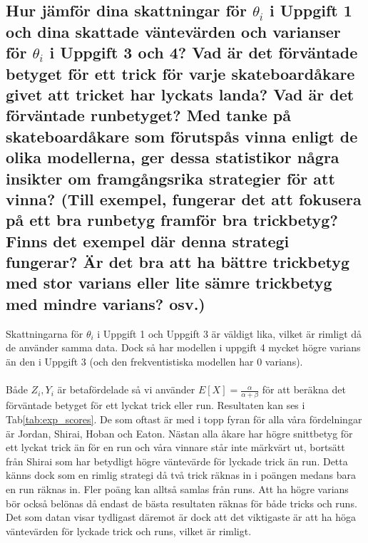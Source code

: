 \documentclass{article}
\begin{document}
\subsection{Hur jämför dina skattningar för $\theta_i$ i Uppgift 1 och dina skattade väntevärden och varianser för $\theta_i$ i Uppgift 3 och 4? Vad är det förväntade betyget för ett trick för varje skateboardåkare givet att tricket har lyckats landa? Vad är det förväntade runbetyget? Med tanke på skateboardåkare som förutspås vinna enligt de olika modellerna, ger dessa statistikor några insikter om framgångsrika strategier för att vinna? (Till exempel, fungerar det att fokusera på ett bra runbetyg framför bra trickbetyg? Finns det exempel där denna strategi fungerar? Är det bra att ha bättre trickbetyg med stor varians eller lite sämre trickbetyg med mindre varians? osv.)}
Skattningarna för $\theta_i$ i Uppgift 1 och Uppgift 3 är väldigt lika, vilket är rimligt då de använder samma data.
Dock så har modellen i uppgift 4 mycket högre varians än den i Uppgift 3 (och den frekventistiska modellen har 0 varians).
\\\\
Både $Z_i, Y_i$ är betafördelade så vi använder $E[X] = \frac{\alpha}{\alpha + \beta}$ för att beräkna det förväntade betyget för ett lyckat trick eller run.
Resultaten kan ses i Tab\ref{tab:exp_scores}. De som oftast är med i topp fyran för alla våra fördelningar är Jordan, Shirai, Hoban och Eaton.
Nästan alla åkare har högre snittbetyg för ett lyckat trick än för en run och våra vinnare står inte märkvärt ut, bortsätt från Shirai som har betydligt högre väntevärde för lyckade trick än run.
Detta känns dock som en rimlig strategi då två trick räknas in i poängen medans bara en run räknas in. Fler poäng kan alltså samlas från runs.
Att ha högre varians bör också belönas då endast de bästa resultaten räknas för både tricks och runs.
Det som datan visar tydligast däremot är dock att det viktigaste är att ha höga väntevärden för lyckade trick och runs, vilket är rimligt.
\end{document}
